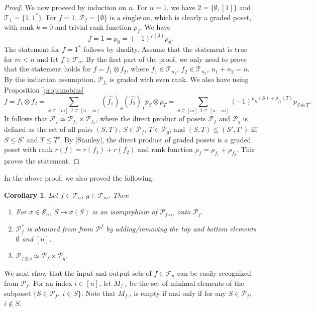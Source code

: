\documentclass[12pt]{article}
\newtheorem{coro}{Corollary}
\theoremstyle{definition}
\theoremstyle{remark}
\def\Te{\mathcal T}
\def\Pe{\mathcal P}
\def\permut{\mathscr{S}}
\begin{document}
\begin{proof}
We now proceed by induction on $n$. For $n=1$, we have $2=\{\emptyset, [1]\}$ and
$\Te_1=\{1,1^*\}$. For $f=1$, $\mathcal P_f=\{\emptyset\}$ is a singleton, which 
is clearly a graded poset, with rank $k=0$ and trivial rank function $\rho_f$.  We have
\[
f = 1=p_\emptyset=(-1)^{\rho(\emptyset)}p_\emptyset.
\]
The statement for $f=1^*$ follows by duality. Assume that the statement is true for $m<n$ and let $f\in \Te_n$.
 By the first part of the proof,  we only need to prove
that the statement holds for $f=f_1\otimes f_2$, where $f_1\in \Te_{n_1}$, $f_2\in
\Te_{n_2}$, $n_1+n_2=n$.  By the induction
assumption, $\Pe_{f_i}$ is graded with even rank. We also
have using Proposition \ref{prop:mobius}
\[
f=f_1\otimes f_2=\sum_{S\subseteq [m], T\subseteq [n-m]} (\widehat {f_1})_S(\widehat
{f_2})_T p_S\otimes p_T=
\sum_{S\subseteq [m], T\subseteq [n-m]}(-1)^{\rho_{f_1}(S)+\rho_{f_2}(T)}p_{S\oplus T}.
\]
It follows that $\Pe_f\simeq \Pe_{f_1}\times \Pe_{f_2}$, where the direct product of posets $\Pe_f$ and
$\Pe_g$ is defined as the set of all pairs $(S,T)$, $S\in \Pe_f$, $T\in \Pe_g$, and
$(S,T)\le (S',T')$ iff $S\le S'$ and $T\le T'$.
By [Stanley], the direct product of graded posets 
is a graded poset with rank $r(f)=r(f_1)+r(f_2)$ and rank function
$\rho_f=\rho_{f_1}+\rho_{f_2}$.  This
proves the statement. 

\end{proof}

In the above proof, we also proved the following.

\begin{coro}\label{coro:Pf} Let $f\in \Te_n$, $g\in \Te_m$. Then
\begin{enumerate}
\item[(i)] For $\sigma\in \permut_n$, $S\mapsto \sigma(S)$ is an
isomprphism  of  $\mathcal P_{f\circ \sigma}$ onto $\mathcal P_{f}$.
\item[(ii)] $\Pe_f^*$ is obtained from from $\Pe^f$ by adding/removing the top and bottom
elements $\emptyset$ and $[n]$.
\item[(iii)] $\Pe_{f\otimes g}\simeq \Pe_f\times \Pe_g$.
\end{enumerate}


\end{coro}



We next show that the input and output sets of $f\in \Te_n$ can be easily recognized from $\Pe_f$. For an
index $i\in [n]$, let  $M_{f,i}$ be the set of minimal elements of the subposet $\{S\in \Pe_f,\ i\in S\}$.
Note that  $M_{f,i}$ is empty if and only if for any $S\in \Pe_f$, $i\notin S$.
\end{document}
